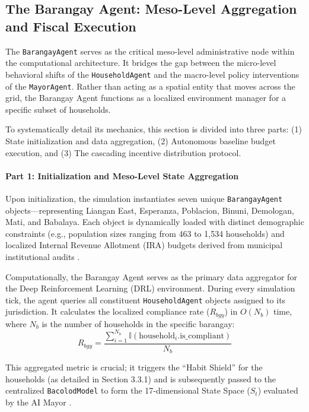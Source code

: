 \subsection{The Barangay Agent: Meso-Level Aggregation and Fiscal Execution}

The \texttt{BarangayAgent} serves as the critical meso-level administrative node within the computational architecture. It bridges the gap between the micro-level behavioral shifts of the \texttt{HouseholdAgent} and the macro-level policy interventions of the \texttt{MayorAgent}. Rather than acting as a spatial entity that moves across the grid, the Barangay Agent functions as a localized environment manager for a specific subset of households. 

To systematically detail its mechanics, this section is divided into three parts: (1) State initialization and data aggregation, (2) Autonomous baseline budget execution, and (3) The cascading incentive distribution protocol.

\paragraph{Part 1: Initialization and Meso-Level State Aggregation}

Upon initialization, the simulation instantiates seven unique \texttt{BarangayAgent} objects—representing Liangan East, Esperanza, Poblacion, Binuni, Demologan, Mati, and Babalaya. Each object is dynamically loaded with distinct demographic constraints (e.g., population sizes ranging from 463 to 1,534 households) and localized Internal Revenue Allotment (IRA) budgets derived from municipal institutional audits \citep{Delena2025}.

Computationally, the Barangay Agent serves as the primary data aggregator for the Deep Reinforcement Learning (DRL) environment. During every simulation tick, the agent queries all constituent \texttt{HouseholdAgent} objects assigned to its jurisdiction. It calculates the localized compliance rate ($R_{bgy}$) in $O(N_b)$ time, where $N_b$ is the number of households in the specific barangay:
\begin{equation}
    R_{bgy} = \frac{\sum_{i=1}^{N_b} \mathbb{I}(\text{household}_i.\text{is\_compliant})}{N_b}
    \label{eq:bgy_compliance}
\end{equation}

This aggregated metric is crucial; it triggers the ``Habit Shield'' for the households (as detailed in Section 3.3.1) and is subsequently passed to the centralized \texttt{BacolodModel} to form the 17-dimensional State Space ($S_t$) evaluated by the AI Mayor \citep{TianReview2024}.

